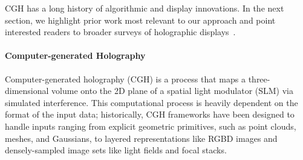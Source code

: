 CGH has a long history of algorithmic and display innovations. In the next section, we highlight prior work most relevant to our approach and point interested readers to broader surveys of holographic displays~\cite{yaracs2010state,park2017recent,chang2020toward,javidi2021roadmap,pi2022review}.

\paragraph{\bf{Computer-generated Holography}}

Computer-generated holography (CGH) is a process that maps a three-dimensional volume onto the 2D plane of a spatial light modulator (SLM) via simulated interference. This computational process is heavily dependent on the format of the input data; historically, CGH frameworks have been designed to handle inputs ranging from explicit geometric primitives, such as point clouds, meshes, and Gaussians, to layered representations like RGBD images and densely-sampled image sets like light fields and focal stacks.


\iffalse
\renewcommand{\arraystretch}{1.1}
\setlength{\tabcolsep}{4pt} 
\setlength{\textfloatsep}{10pt}


